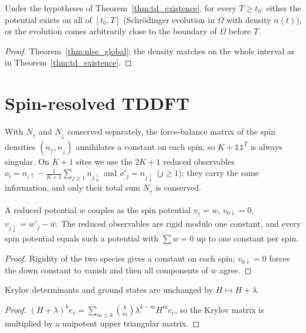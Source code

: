 \begin{theorem}
  \label{thm:td_global}
  \leanok
  Under the hypotheses of Theorem~\ref{thm:td_existence}, for every $T\ge t_0$: either the potential exists on all of
  $[t_0,T]$ (Schr\"odinger evolution in $\Omega$ with density $n(t)$), or the evolution comes arbitrarily close to
  the boundary of $\Omega$ before $T$.
\end{theorem}
\begin{proof}
  \leanok
  Theorem~\ref{thm:nlse_global}; the density matches on the whole interval as in Theorem~\ref{thm:td_existence}.
\end{proof}

\section{Spin-resolved TDDFT}

With $N_\uparrow$ and $N_\downarrow$ conserved separately, the force-balance matrix of the spin densities
$(n_\uparrow,n_\downarrow)$ annihilates a constant on each spin, so $K+\mathbb 1\mathbb 1^T$ is always singular. On
$K+1$ sites we use the $2K+1$ reduced observables $o_i=n_{i\uparrow}-\frac1{K+1}\sum_{j\ge1}n_{j\downarrow}$ and
$o'_j=n_{j\downarrow}$ ($j\ge1$); they carry the same information, and only their total sum $N_\uparrow$ is conserved.

\begin{lemma}
  \label{lem:spin_obs}
  \leanok
  A reduced potential $w$ couples as the spin potential $v_\uparrow=w$, $v_{0\downarrow}=0$,
  $v_{j\downarrow}=w'_j-\bar w$. The reduced observables are rigid modulo one constant, and every spin potential
  equals such a potential with $\sum w=0$ up to one constant per spin.
\end{lemma}
\begin{proof}
  \leanok
  Rigidity of the two species gives a constant on each spin; $v_{0\downarrow}=0$ forces the down constant to vanish
  and then all components of $w$ agree.
\end{proof}

\begin{lemma}
  \label{lem:kry_shift}
  \leanok
  Krylov determinants and ground states are unchanged by $H\mapsto H+\lambda$.
\end{lemma}
\begin{proof}
  \leanok
  $(H+\lambda)^k e_c=\sum_{m\le k}\binom km\lambda^{k-m}H^me_c$, so the Krylov matrix is multiplied by a unipotent
  upper triangular matrix.
\end{proof}

